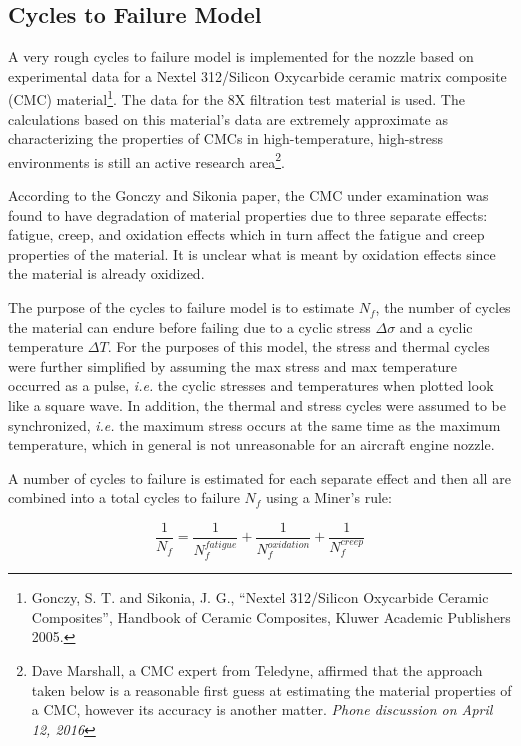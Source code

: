\documentclass{article}
\begin{document}
\subsection{Cycles to Failure Model}

A very rough cycles to failure model is implemented for the nozzle based on experimental data for a Nextel 312/Silicon Oxycarbide ceramic matrix composite (CMC) material\footnote{Gonczy, S. T. and Sikonia, J. G., ``Nextel 312/Silicon Oxycarbide Ceramic Composites'', Handbook of Ceramic Composites, Kluwer Academic Publishers 2005.}. The data for the 8X filtration test material is used. The calculations based on this material's data are extremely approximate as characterizing the properties of CMCs in high-temperature, high-stress environments is still an active research area\footnote{Dave Marshall, a CMC expert from Teledyne, affirmed that the approach taken below is a reasonable first guess at estimating the material properties of a CMC, however its accuracy is another matter. \textit{Phone discussion on April 12, 2016}}.

According to the Gonczy and Sikonia paper, the CMC under examination was found to have degradation of material properties due to three separate effects: fatigue, creep, and oxidation effects which in turn affect the fatigue and creep properties of the material. It is unclear what is meant by oxidation effects since the material is already oxidized.

The purpose of the cycles to failure model is to estimate $N_f$, the number of cycles the material can endure before failing due to a cyclic stress $\Delta \sigma$ and a cyclic temperature $\Delta T$. For the purposes of this model, the stress and thermal cycles were further simplified by assuming the max stress and max temperature occurred as a pulse, \textit{i.e.} the cyclic stresses and temperatures when plotted look like a square wave. In addition, the thermal and stress cycles were assumed to be synchronized, \textit{i.e.} the maximum stress occurs at the same time as the maximum temperature, which in general is not unreasonable for an aircraft engine nozzle.

A number of cycles to failure is estimated for each separate effect and then all are combined into a total cycles to failure $N_f$ using a Miner's rule:

\begin{equation}
  \frac{1}{N_f} = \frac{1}{N_f^{fatigue}} + \frac{1}{N_f^{oxidation}} + \frac{1}{N_f^{creep}}
\end{equation}
\end{document}
